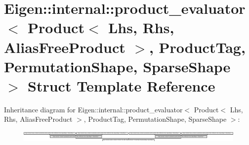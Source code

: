 \hypertarget{struct_eigen_1_1internal_1_1product__evaluator_3_01_product_3_01_lhs_00_01_rhs_00_01_alias_free_0706ef7a5a2e7de13f2e1755913a650d}{}\section{Eigen\+:\+:internal\+:\+:product\+\_\+evaluator$<$ Product$<$ Lhs, Rhs, Alias\+Free\+Product $>$, Product\+Tag, Permutation\+Shape, Sparse\+Shape $>$ Struct Template Reference}
\label{struct_eigen_1_1internal_1_1product__evaluator_3_01_product_3_01_lhs_00_01_rhs_00_01_alias_free_0706ef7a5a2e7de13f2e1755913a650d}
Inheritance diagram for Eigen\+:\+:internal\+:\+:product\+\_\+evaluator$<$ Product$<$ Lhs, Rhs, Alias\+Free\+Product $>$, Product\+Tag, Permutation\+Shape, Sparse\+Shape $>$\+:\begin{figure}[H]
\begin{center}
\leavevmode
\includegraphics[height=0.576132cm]{struct_eigen_1_1internal_1_1product__evaluator_3_01_product_3_01_lhs_00_01_rhs_00_01_alias_free_0706ef7a5a2e7de13f2e1755913a650d}
\end{center}
\end{figure}
